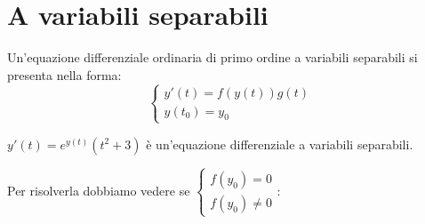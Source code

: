 \section{A variabili separabili}

Un'equazione differenziale ordinaria di primo ordine a variabili separabili si presenta nella forma:
\begin{equation*}\begin{cases}y'(t)=f(y(t))g(t)\\y(t_0)=y_0\end{cases}\end{equation*}
\begin{example}
    $y'(t)=e^{y(t)}(t^2+3)$ è un'equazione differenziale a variabili separabili.
\end{example}
Per risolverla dobbiamo vedere se $\begin{cases}f(y_0)=0\\f(y_0)\neq0\end{cases}$:
